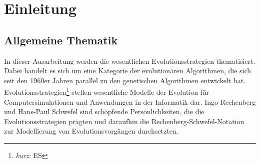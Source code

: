 
\section{Einleitung}

\subsection{Allgemeine Thematik}

In dieser Ausarbeitung werden die wesentlichen Evolutionsstrategien thematisiert.
Dabei handelt es sich um eine Kategorie der evolutionären Algorithmen, die sich seit den 1960er Jahren parallel zu den genetischen Algorithmen entwickelt hat.
Evolutionsstrategien\footnote{\textit{kurz:} ES} stellen wesentliche Modelle der Evolution für Computersimulationen und Anwendungen in der Informatik dar.
Ingo Rechenberg und Hans-Paul Schwefel sind schöpfende Persönlichkeiten, die die Evolutionsstrategien prägten und daraufhin die Rechenberg-Schwefel-Notation zur Modellierung von Evolutionsvorgängen durchsetzten.

